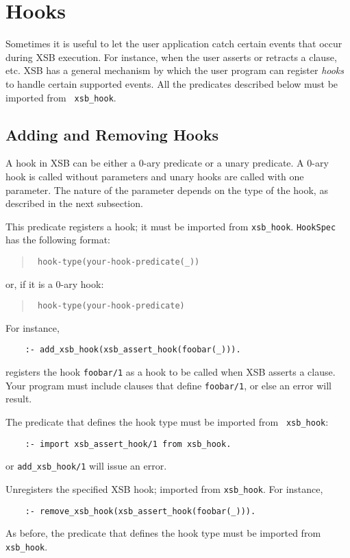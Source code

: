 \chapter{Hooks} \label{hooks}

Sometimes it is useful to let the user application catch certain
events that occur during XSB execution. For instance, when the user
asserts or retracts a clause, etc.
XSB has a general mechanism by which the
user program can register \emph{hooks} to handle certain supported
events. All the predicates described below must be imported from {\tt
xsb\_hook}.


\section{Adding and Removing Hooks}

A hook in XSB can be either a 0-ary predicate or a unary predicate.
A 0-ary hook is called without parameters and unary hooks are called with
one parameter. The nature of the parameter depends on the type of the hook,
as described in the next subsection.


\begin{description}
  

This predicate registers a hook; it must be imported from {\tt xsb\_hook}.
{\tt HookSpec} has the following format:
\begin{quote}
 {\tt
   hook-type(your-hook-predicate(\_))
   }
\end{quote}
or, if it is a 0-ary hook:
\begin{quote}
  {\tt
   hook-type(your-hook-predicate)
   }  
\end{quote}
For instance, 
\begin{verbatim}
    :- add_xsb_hook(xsb_assert_hook(foobar(_))).
\end{verbatim}
registers the hook {\tt foobar/1} as a hook to be called when XSB
asserts a clause. Your program must include
clauses that define {\tt foobar/1}, or else an error will result.

The predicate that defines the hook type must be imported from {\tt
  xsb\_hook}:
\begin{verbatim}
    :- import xsb_assert_hook/1 from xsb_hook.  
\end{verbatim}
or {\tt add\_xsb\_hook/1} will issue an error.

 

Unregisters the specified XSB hook; imported from {\tt xsb\_hook}. For
instance,
\begin{verbatim}
    :- remove_xsb_hook(xsb_assert_hook(foobar(_))).
\end{verbatim}
As before, the predicate that defines the hook type must be imported from
{\tt xsb\_hook}.
\end{description}


